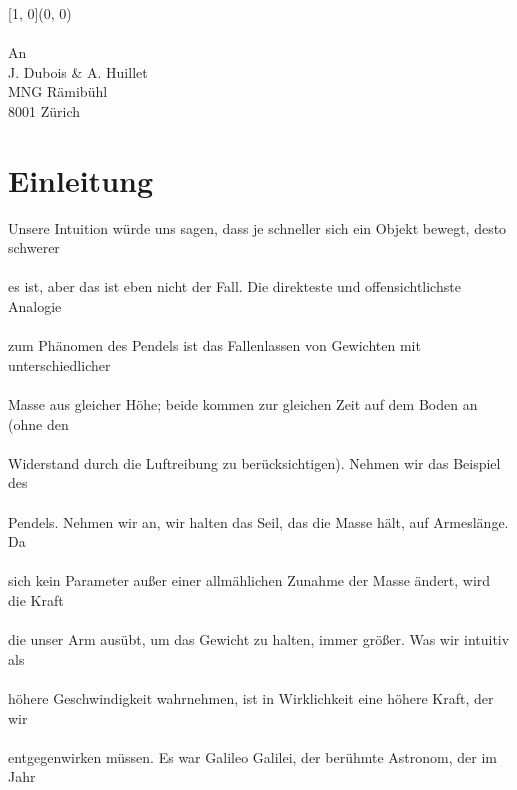 \documentclass[12pt, a4paper, twoside]{article}
\begin{document}
    
    \begin{textblock}{\pgfmathresult}[1, 0](0, 0)
    \noindent
    \\\\An \\ J. Dubois \& A. Huillet\\ MNG Rämibühl\\ 8001 Zürich
    \end{textblock}
    

    \newpage

    \section{Einleitung}
    Unsere Intuition würde uns sagen, dass je schneller sich ein Objekt bewegt, desto schwerer\\\\
    es ist, aber das ist eben nicht der Fall. Die direkteste und offensichtlichste Analogie\\\\
    zum Phänomen des Pendels ist das Fallenlassen von Gewichten mit unterschiedlicher\\\\
    Masse aus gleicher Höhe; beide kommen zur gleichen Zeit auf dem Boden an (ohne den\\\\
    Widerstand durch die Luftreibung zu berücksichtigen). Nehmen wir das Beispiel des \\\\
    Pendels. Nehmen wir an, wir halten das Seil, das die Masse hält, auf Armeslänge. Da\\\\
    sich kein Parameter außer einer allmählichen Zunahme der Masse ändert, wird die Kraft\\\\
    die unser Arm ausübt, um das Gewicht zu halten, immer größer.  Was wir intuitiv als\\\\
    höhere Geschwindigkeit wahrnehmen, ist in Wirklichkeit eine höhere Kraft, der wir \\\\
    entgegenwirken müssen. Es war Galileo Galilei, der berühmte Astronom, der im Jahr\\\\
\end{document}

